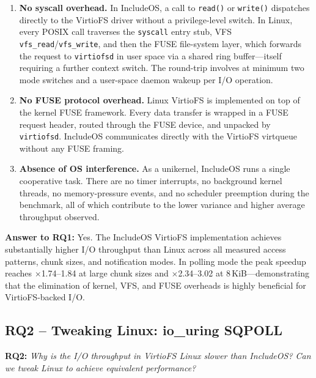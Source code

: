 \begin{enumerate}
  \item \textbf{No syscall overhead.}  In IncludeOS, a call to
    \texttt{read()} or \texttt{write()} dispatches directly to the
    VirtioFS driver without a privilege-level switch.  In Linux, every
    POSIX call traverses the \texttt{syscall} entry stub, VFS
    \texttt{vfs\_read}/\texttt{vfs\_write}, and then the FUSE file-system
    layer, which forwards the request to \texttt{virtiofsd} in user space
    via a shared ring buffer—itself requiring a further context switch.
    The round-trip involves at minimum two mode switches and a user-space
    daemon wakeup per I/O operation.

  \item \textbf{No FUSE protocol overhead.}  Linux VirtioFS is
    implemented on top of the kernel FUSE framework.  Every data transfer
    is wrapped in a FUSE request header, routed through the FUSE device,
    and unpacked by \texttt{virtiofsd}.  IncludeOS communicates directly
    with the VirtioFS virtqueue without any FUSE framing.

  \item \textbf{Absence of OS interference.}  As a unikernel, IncludeOS
    runs a single cooperative task.  There are no timer interrupts, no
    background kernel threads, no memory-pressure events, and no
    scheduler preemption during the benchmark, all of which contribute to
    the lower variance and higher average throughput observed.
\end{enumerate}

\textbf{Answer to RQ1:} Yes.  The IncludeOS VirtioFS implementation
achieves substantially higher I/O throughput than Linux across all
measured access patterns, chunk sizes, and notification modes.  In
polling mode the peak speedup reaches $\times$1.74--1.84 at large chunk
sizes and $\times$2.34--3.02 at 8\,KiB—demonstrating that the
elimination of kernel, VFS, and FUSE overheads is highly beneficial for
VirtioFS-backed I/O.

\subsection{RQ2 – Tweaking Linux: io\_uring SQPOLL}
\label{sec:rq2}

\textbf{RQ2:} \emph{Why is the I/O throughput in VirtioFS Linux slower
than IncludeOS?  Can we tweak Linux to achieve equivalent performance?}

